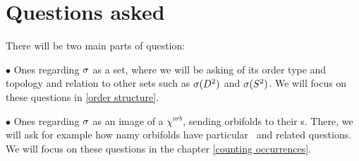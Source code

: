 \label{moving from interior to boundary}


\section{Questions asked}
There will be two main parts of question: 

$\bullet$ Ones regarding ${\sigma}$ as a set, where we will be asking 
of its order type and topology and relation to other sets such as ${{\sigma}(D^2)}$ and ${{\sigma}(S^2)}$. 
We will focus on these questions in \ref{order structure}. 

$\bullet$ Ones regarding ${\sigma}$ as an image of a $\chi^{orb}$, sending orbifolds to their \Eoc s. 
There, we will ask for example how namy orbifolds have particular \Eoc\ and 
related questions. We will focus on these questions in the chapter \ref{counting occurrences}.  






